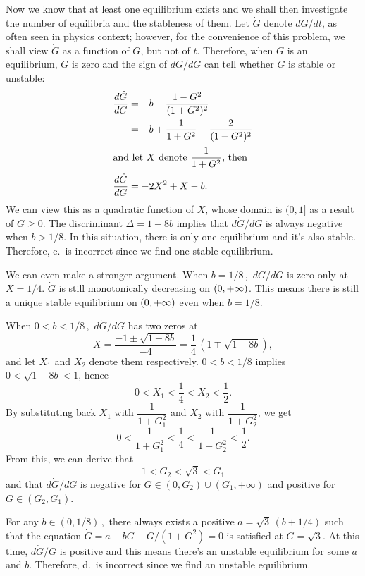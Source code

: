     Now we know that at least one equilibrium exists and we shall then
    investigate the number of equilibria and the stableness of them. Let $
    \dot{G} $ denote $ {dG}/{dt} $, as often seen in physics context; however,
    for the convenience of this problem, we shall view $ \dot{G} $ as a function
    of $ G $, but not of $ t $. Therefore, when $ G $ is an equilibrium, $
    \dot{G} $ is zero and the sign of $ {d\dot{G}}/{dG} $ can tell whether $ G $
    is stable or unstable:
        \begin{align*}
            \frac{d\dot{G}}{dG} &= -b - \frac{1-G^2}{(1+G^2)^2} \\
                &= -b + \frac{1}{1+G^2} - \frac{2}{(1+G^2)^2} \\
            \shortintertext{and let $ X $ denote $ \dfrac1{1+G^2} $,
                then}
            \frac{d\dot{G}}{dG} &= -2X^2 + X - b.
        \end{align*}
    We can view this as a quadratic function of $ X $, whose domain is $ (0,1] $
    as a result of $ G \ge 0 $. The discriminant $ \Delta = 1 - 8b $ implies
    that $ {d\dot{G}}/{dG} $ is always negative when $ b > {1}/{8} $. In
    this situation, there is only one equilibrium and it's also stable.
    Therefore, e.\ is incorrect since we find one stable equilibrium. \pagebreak
        
    We can even make a stronger argument. When ${ b = {1}/{8} }$\,,\, ${
    {d\dot{G}}/{dG} }$ is zero only at $ X = {1}/{4} $. $ \dot{G} $ is
    still monotonically decreasing on $ (0,+\infty) $. This means there is still a unique
    stable equilibrium on $ (0,+\infty){} $ even when $ b = {1}/{8} $.
    
    When $ 0 < b < {1}/{8} $\,,\, $ {d\dot{G}}/{dG} $ has two zeros at
        \[  X = \frac{-1 \pm \sqrt{1-8b}}{-4} = \frac{1}{4} \, (1 \mp
        \sqrt{1-8b}), \]
    and let $ X_1 $ and $ X_2 $ denote them respectively. $ 0 < b < {1}/{8} $
    implies $ 0 < \sqrt{1-8b} < 1 $, hence
        \[ 0 < X_1 < \frac{1}{4} < X_2 < \frac{1}{2}. \]
    By substituting back $ X_1 $ with $ \dfrac1{1+G_1^2} $ and $ X_2 $ with $
    \dfrac1{1+G_2^2} $, we get
        \[ 0 < \frac{1}{1+G_1^2} < \frac{1}{4} < \frac{1}{1+G_2^2} <
        \frac{1}{2}. \]
    From this, we can derive that
        \[ 1 < G_2 < \sqrt{3} < G_1 \]
    and that $ d\dot{G}/dG $ is negative for $ G \in (0,G_2) \cup
    (G_1,+\infty) $ and positive for $ G \in (G_2,G_1) $.
    
    For any $ b \in (0,1/8) $\,,\, there always exists a positive $ a = \sqrt{3}
    \, (b + 1/4) $ such that the equation $ {\dot{G} = a - bG - G/(1+G^2) = 0} $
    is satisfied at $ {G = \sqrt{3}} $. At this time, $ d\dot{G}/G $ is positive
    and this means there's an unstable equilibrium for some $ a $ and $ b $.
    Therefore, d.\ is incorrect since we find an unstable equilibrium.
    
